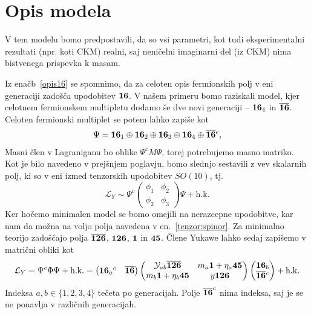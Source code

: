 \chapter{Opis modela}

V tem modelu bomo predpostavili, da so vsi parametri, kot tudi eksperimentalni rezultati
(npr. koti CKM) realni, saj neničelni imaginarni del (iz CKM) nima bistvenega prispevka k masam.

Iz enačb~\eqref{opis16} se spomnimo, da za celoten opis fermionskih polj v eni generaciji zadošča
upodobitev $\mathbf{16}$. V našem primeru bomo raziskali model, kjer celotnem fermionskem multipletu
dodamo še dve novi generaciji -- $\mathbf{16}_4$ in $\overline{\mathbf{16}}$. Celoten fermionski multiplet se potem
lahko zapiše kot
\begin{align}
	\Psi = \mathbf{16}_1 \oplus \mathbf{16}_2 \oplus \mathbf{16}_3 \oplus \mathbf{16}_4 \oplus \overline{\mathbf{16}}{}^c,
	\label{fermioni}
\end{align}
Masni člen v Lagraniganu bo oblike $\Psi^c M \Psi$, torej potrebujemo masno matriko. Kot je bilo
navedeno v prejšnjem poglavju, bomo slednjo sestavili z vev skalarnih polj, ki so v eni izmed
tenzorskih upodobitev $SO(10)$, tj.
\begin{equation}
	\mathcal{L}_Y \sim \Psi^c\begin{pmatrix}
		\phi_1 & \phi_2 \\
		\phi_2 & \phi_3
	\end{pmatrix} \Psi + \text{h.k.}
\end{equation}
Ker hočemo minimalen model se bomo omejili na nerazcepne upodobitve, kar nam da možna na voljo polja
navedena v en.~\eqref{tenzor:spinor}. Za minimalno teorijo zadoščajo polja $\overline{\mathbf{126}}$, $\mathbf{126}$,
$\mathbf{1}$ in $\mathbf{45}$. Člene Yukawe lahko sedaj zapišemo v matrični obliki kot
\begin{align}
	\mathcal{L}_Y = \Psi^c \Phi \Psi + \text{h.k.} = \begin{pmatrix}
		\mathbf{16}_a{}^c & \overline{\mathbf{16}}
	\end{pmatrix}
	\begin{pmatrix}
		\mathcal{Y}_{ab} \overline{\mathbf{126}} & m_a\mathbf{1} + \eta_a\mathbf{45} \\
		m_b\mathbf{1} + \eta_b\mathbf{45} & y\mathbf{126}
	\end{pmatrix}
	\begin{pmatrix}
		\mathbf{16}_b \\ \overline{\mathbf{16}}{}^c
	\end{pmatrix} + \text{h.k.}
	\label{great:mass}
\end{align}
Indeksa $a,b \in \{1,2,3,4\}$ tečeta po generacijah. Polje $\overline{\mathbf{16}}^c$ nima indeksa, saj je
se ne ponavlja v različnih generacijah.

